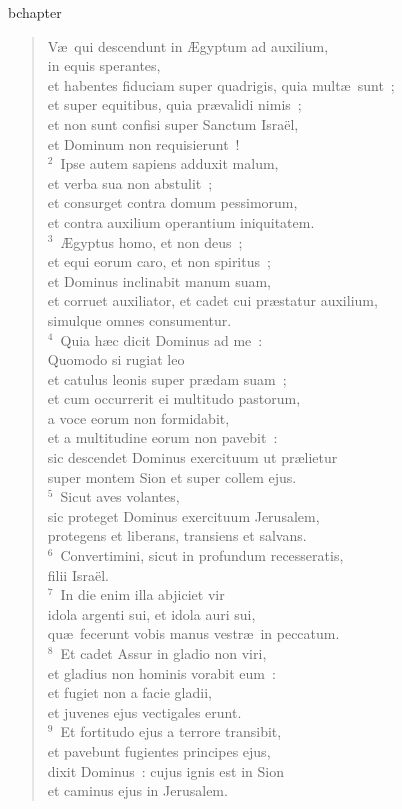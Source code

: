 bchapter\begin{verse}\vspace{-19pt}V\ae\ qui descendunt in \AE gyptum ad auxilium,\\ in equis sperantes,\\ et habentes fiduciam super quadrigis, quia mult\ae\ sunt~;\\ et super equitibus, quia pr\ae validi nimis~;\\ et non sunt confisi super Sanctum Isra\"el,\\ et Dominum non requisierunt~!\\
${}^{2}$~Ipse autem sapiens adduxit malum,\\ et verba sua non abstulit~;\\ et consurget contra domum pessimorum,\\ et contra auxilium operantium iniquitatem.\\
${}^{3}$~\AE gyptus homo, et non deus~;\\ et equi eorum caro, et non spiritus~;\\ et Dominus inclinabit manum suam,\\ et corruet auxiliator, et cadet cui pr\ae statur auxilium,\\ simulque omnes consumentur.\\
${}^{4}$~Quia h\ae c dicit Dominus ad me~:\\ Quomodo si rugiat leo\\ et catulus leonis super pr\ae dam suam~;\\ et cum occurrerit ei multitudo pastorum,\\ a voce eorum non formidabit,\\ et a multitudine eorum non pavebit~:\\ sic descendet Dominus exercituum ut pr\ae lietur\\ super montem Sion et super collem ejus.\\
${}^{5}$~Sicut aves volantes,\\ sic proteget Dominus exercituum Jerusalem,\\ protegens et liberans, transiens et salvans.\\
${}^{6}$~Convertimini, sicut in profundum recesseratis,\\ filii Isra\"el.\\
${}^{7}$~In die enim illa abjiciet vir\\ idola argenti sui, et idola auri sui,\\ qu\ae\ fecerunt vobis manus vestr\ae\ in peccatum.\\
${}^{8}$~Et cadet Assur in gladio non viri,\\ et gladius non hominis vorabit eum~:\\ et fugiet non a facie gladii,\\ et juvenes ejus vectigales erunt.\\
${}^{9}$~Et fortitudo ejus a terrore transibit,\\ et pavebunt fugientes principes ejus,\\ dixit Dominus~: cujus ignis est in Sion\\ et caminus ejus in Jerusalem.\end{verse}


